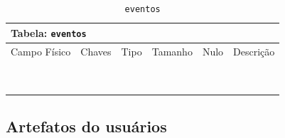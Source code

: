 \documentclass[12pt,a4paper]{article}
\begin{document}
\begin{center}
\begin{table}[h!]
	\caption{\texttt{eventos}}
	\label{tabela:eventos}
	\begin{tabular}{|p{2.5cm}|p{1cm}|p{1.25cm}|p{1.75cm}|p{1.25cm}|p{5cm}|}\hline	
		\multicolumn{6}{|p{16cm}|}{\cellcolor{cinzaClaro}  \centering Tabela: \texttt{eventos}} \\ \hline %
		{\small Campo Físico}   & {\small Chaves} & {\small Tipo} & {\small Tamanho} & {\small Nulo} & {\small Descrição}\\\hline %
		
		{\tiny } & {\tiny } & {\tiny } & {\tiny } & {\tiny } &{\tiny }\\\hline
		{\tiny } & {\tiny } & {\tiny } & {\tiny } & {\tiny } &{\tiny }\\\hline
		{\tiny } & {\tiny } & {\tiny } & {\tiny } & {\tiny } &{\tiny }\\\hline
		{\tiny } & {\tiny } & {\tiny } & {\tiny } & {\tiny } &{\tiny }\\\hline
		{\tiny } & {\tiny } & {\tiny } & {\tiny } & {\tiny } &{\tiny }\\\hline
		{\tiny } & {\tiny } & {\tiny } & {\tiny } & {\tiny } &{\tiny }\\\hline
		{\tiny } & {\tiny } & {\tiny } & {\tiny } & {\tiny } &{\tiny }\\\hline
		{\tiny } & {\tiny } & {\tiny } & {\tiny } & {\tiny } &{\tiny }\\\hline
		{\tiny } & {\tiny } & {\tiny } & {\tiny } & {\tiny } &{\tiny }\\\hline
		
			
	\end{tabular}
\end{table}	
\end{center}

\subsection{Artefatos do usuários}

\end{document}
